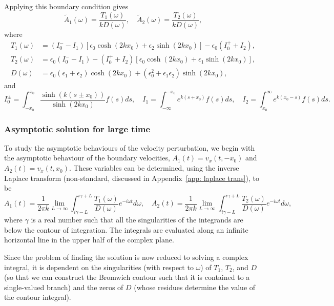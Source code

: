 \documentclass{aastex61}
\begin{document}
Applying this boundary condition gives
\begin{equation}
\tilde{A}_1(\omega) = \frac{T_1(\omega)}{k D(\omega)}, \quad \tilde{A}_2(\omega) = \frac{T_2(\omega)}{k D(\omega)},
\end{equation}
where
\begin{align}
T_1(\omega) & = (I_0^- - I_1)[\epsilon_0\cosh(2kx_0) + \epsilon_2\sinh(2kx_0)] - \epsilon_0(I_0^+ + I_2), \\
T_2(\omega) & = \epsilon_0(I_0^- - I_1) - (I_0^+ + I_2)[\epsilon_0\cosh(2kx_0) + \epsilon_1\sinh(2kx_0)], \\
D(\omega) & = \epsilon_0(\epsilon_1 + \epsilon_2)\cosh(2kx_0) + (\epsilon_0^2 + \epsilon_1\epsilon_2)\sinh(2kx_0),
\label{D incomp}
\end{align}
and
\begin{equation}
I_0^\pm = \int_{-x_0}^{x_0} \frac{\sinh(k(s \pm x_0))}{\sinh(2kx_0)} f(s) ds,
\quad
I_1 = \int_{-\infty}^{-x_0} e^{k(s + x_0)} f(s) ds,
\quad
I_2 = \int_{x_0}^\infty e^{k(x_0 - s)} f(s) ds.
\end{equation}


\subsubsection{Asymptotic solution for large time}
To study the asymptotic behaviours of the velocity perturbation, we begin with the asymptotic behaviour of the boundary velocities, $A_1(t) = v_x(t, -x_0)$ and $A_2(t) = v_x(t, x_0)$. These variables can be determined, using the inverse Laplace transform (non-standard, discussed in Appendix~\ref{app: laplace trans}), to be
\begin{equation}
A_1(t) = \frac{1}{2\pi k} \lim_{L \to \infty} \int_{i\gamma - L}^{i\gamma + L} \frac{T_1(\omega)}{D(\omega)} e^{-i\omega t} d\omega,
\quad
A_2(t) = \frac{1}{2\pi k} \lim_{L \to \infty} \int_{i\gamma - L}^{i\gamma + L} \frac{T_2(\omega)}{D(\omega)} e^{-i\omega t} d\omega,
\label{A inv laplace}
\end{equation}
where $\gamma$ is a real number such that all the singularities of the integrands are below the contour of integration. The integrals are evaluated along an infinite horizontal line in the upper half of the complex plane.

Since the problem of finding the solution is now reduced to solving a complex integral, it is dependent on the singularities (with respect to $\omega$) of $T_1$, $T_2$, and $D$ (so that we can construct the Bromwich contour such that it is contained to a single-valued branch) and the zeros of $D$ (whose residues determine the value of the contour integral).
\end{document}
